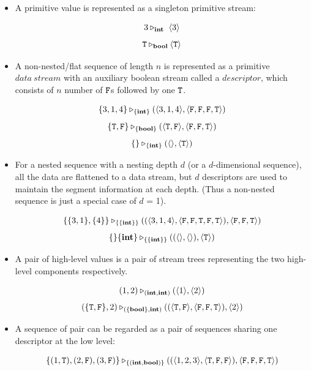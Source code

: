 \begin{itemize}
	\item A primitive value is represented as a singleton primitive stream: 
	\begin{example}
		$$3 \tr_\int \ \< 3 \'>$$
		$$ \mathtt{T} \triangleright_{\mathbf{bool}} \langle \mathtt{T} \rangle $$
	\end{example}
	
	
	\item A non-nested/flat sequence of length $n$ is represented as a primitive $data \ stream$ with an auxiliary boolean stream called a $descriptor$, which consists of $n$ number of $\mathtt{F}$s followed by one $\mathtt{T}$. 
	\begin{example}
		$$\{3,1,4\} \tr_{\{\int\}} (\< 3,1,4 \'>, \< \F, \F,\F , \T \'>) $$
		$$\{\T,\F\} \tr_{\{\bool\}} (\< \T,\F\'>, \< \F,\F , \T \'>) $$
		$$\{\} \triangleright_{\{\mathbf{int} \}} (\langle \rangle, \langle \mathtt{T} \rangle)$$
	\end{example}
	
	\item For a nested sequence with a nesting depth $d$ (or a $d$-dimensional sequence), all the data are flattened to a data stream, but $d$ descriptors are used to maintain the segment information at each depth. 
	(Thus a non-nested sequence is just a special case of $d$ = 1).
	
	\begin{example}
		$$\{\{3,1\}, \{4\}\} \tr_{\{\{\int\}\}} ((\< 3,1,4 \'>, \<\F,\F,\T,\F,\T \'>),\< \F, \F, \T \'>)  $$		
		$$\{\}\{\mathbf{int}\} \triangleright_{\{\{\mathbf{int}\}\}} ((\langle \rangle, \langle \rangle), \langle \mathtt{T} \rangle)$$
	\end{example}

	
	\item A pair of high-level values is a pair of stream trees representing the two high-level components respectively.  
	\begin{example}
		$$(1,2) \triangleright_{(\mathbf{int},\mathbf{int})} (\langle 1 \rangle, \langle 2 \rangle)$$
		$$(\{\T,\F\},2) \tr_{(\{\bool\},\int)} ((\< \T, \F \'>, \< \F,\F,\T \'>),\singl{2})$$
	\end{example} 
	
	\item A sequence of pair can be regarded as a pair of sequences sharing one descriptor at the low level:
	\begin{example}
		$$\{(1,\T),(2,\F),(3,\F)\} \tr_{\{(\int,\bool)\}} ((\<1,2,3\'>, \<\T,\F, \F\'>), \< \F,\F,\F,\T \'>)$$
	\end{example}
	
	
\end{itemize}



